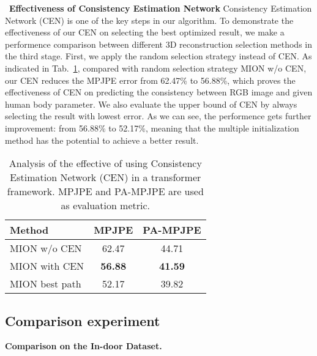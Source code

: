 \documentclass[sigconf]{acmart}
\begin{document}
~\textbf{Effectiveness of Consistency Estimation Network} 
Consistency Estimation Network (CEN) is one of the key steps in our algorithm. 
To demonstrate the effectiveness of our CEN on selecting the best optimized result, 
we make a performence comparison between different 3D reconstruction selection methods in the third stage. 
First, we apply the random selection strategy instead of CEN. As indicated in 
Tab.~\ref{table_arn}, compared with random selection strategy MION w/o CEN, our CEN reduces the MPJPE error from 
62.47\% to 56.88\%,  which proves the effectiveness of CEN on predicting the consistency between 
RGB image and given human body parameter. We also evaluate the upper bound of CEN by always selecting the 
result with lowest error. As we can see, the performence gets further improvement: from 56.88\% to 52.17\%, 
meaning that the multiple initialization method has the potential to achieve a better result. 

\begin{table}[t]
	\centering
	
	\begin{tabular}{lcc}
		\toprule
		Method   & MPJPE & PA-MPJPE \\
		\midrule
		MION w/o CEN & 62.47 & 44.71  \\
		MION with CEN   & \textbf{56.88} & \textbf{41.59} \\
		MION best path  & 52.17 & 39.82 \\
		\bottomrule
	\end{tabular}
	\vspace{1em}
	\caption{Analysis of the effective of using Consistency Estimation Network (CEN) 
		in a transformer framework. MPJPE and PA-MPJPE are used as evaluation metric.}
	\label{table_arn}
\end{table}


\subsection{Comparison experiment}

\textbf{Comparison on the In-door Dataset.}
\end{document}
